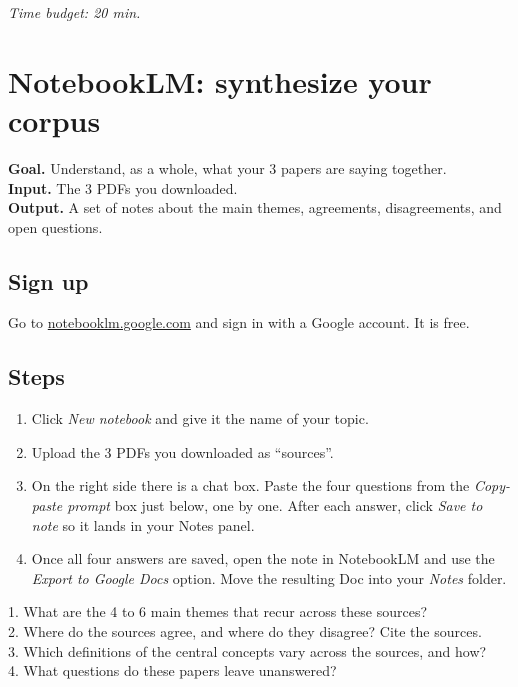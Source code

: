 \documentclass[11pt,a4paper]{article}
\begin{document}
\textit{Time budget: 20 min.}

\section{NotebookLM: synthesize your corpus}
\label{sec:nblm}

\begin{toolheader}
\textbf{Goal.} Understand, as a whole, what your 3 papers are saying together.\\
\textbf{Input.} The 3 PDFs you downloaded.\\
\textbf{Output.} A set of notes about the main themes, agreements, disagreements, and open questions.
\end{toolheader}

\subsection*{Sign up}
Go to \href{https://notebooklm.google.com/}{notebooklm.google.com} and sign in with a Google account. It is free.

\subsection*{Steps}
\begin{enumerate}[leftmargin=*, itemsep=2pt]
  \item Click \emph{New notebook} and give it the name of your topic.
  \item Upload the 3 PDFs you downloaded as ``sources''.
  \item On the right side there is a chat box. Paste the four questions from the \emph{Copy-paste prompt} box just below, one by one. After each answer, click \emph{Save to note} so it lands in your Notes panel.
  \item Once all four answers are saved, open the note in NotebookLM and use the \emph{Export to Google Docs} option. Move the resulting Doc into your \emph{Notes} folder.
\end{enumerate}

\begin{promptbox}
1. What are the 4 to 6 main themes that recur across these sources?\\[2pt]
2. Where do the sources agree, and where do they disagree? Cite the sources.\\[2pt]
3. Which definitions of the central concepts vary across the sources, and how?\\[2pt]
4. What questions do these papers leave unanswered?
\end{promptbox}
\end{document}
